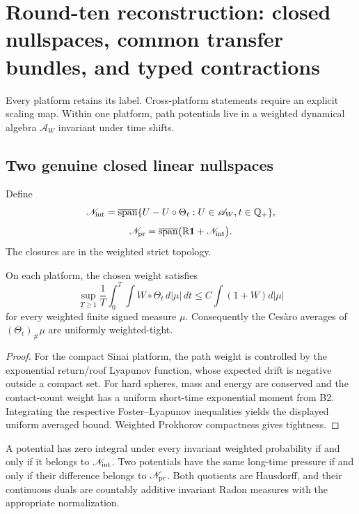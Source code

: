 \section{Round-ten reconstruction: closed nullspaces, common transfer bundles, and typed contractions}
\label{sec:r10-c2}

Every platform retains its label.  Cross-platform statements require an
explicit scaling map.  Within one platform, path potentials live in a weighted
dynamical algebra \(\mathscr A_W\) invariant under time shifts.

\subsection{Two genuine closed linear nullspaces}

Define
\[
 \mathscr N_{\rm int}=
 \overline{\operatorname{span}}
 \{U-U\circ\Theta_t:U\in\mathscr A_W,
                    t\in\mathbb Q_+\},
\]
\[
 \mathscr N_{\rm pr}=
 \overline{\operatorname{span}}
 \bigl(\mathbb R\mathbf1+\mathscr N_{\rm int}\bigr).
\]
The closures are in the weighted strict topology.

\begin{lemma}
\label{lem:r10-c2-cesaro}
On each platform, the chosen weight satisfies
\[
 \sup_{T\ge1}\frac1T\int_0^T
 \int W\circ\Theta_t\,d|\mu|\,dt
 \le C\int(1+W)d|\mu|
\]
for every weighted finite signed measure \(\mu\).  Consequently the Ces\`aro
averages of \((\Theta_t)_\#\mu\) are uniformly weighted-tight.
\end{lemma}

\begin{proof}
For the compact Sinai platform, the path weight is controlled by the
exponential return/roof Lyapunov function, whose expected drift is negative
outside a compact set.  For hard spheres, mass and energy are conserved and
the contact-count weight has a uniform short-time exponential moment from B2.
Integrating the respective Foster--Lyapunov inequalities yields the displayed
uniform averaged bound.  Weighted Prokhorov compactness gives tightness.
\end{proof}

\begin{theorem}
\label{thm:r10-c2-null}
A potential has zero integral under every invariant weighted probability if
and only if it belongs to \(\mathscr N_{\rm int}\).  Two potentials have the
same long-time pressure if and only if their difference belongs to
\(\mathscr N_{\rm pr}\).  Both quotients are Hausdorff, and their continuous
duals are countably additive invariant Radon measures with the appropriate
normalization.
\end{theorem}

